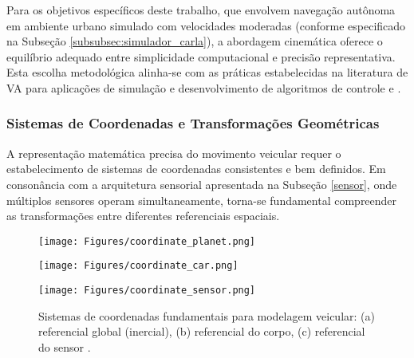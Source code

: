 Para os objetivos específicos deste trabalho, que envolvem navegação autônoma em ambiente urbano simulado com velocidades moderadas (conforme especificado na Subseção \ref{subsubsec:simulador_carla}), a abordagem cinemática oferece o equilíbrio adequado entre simplicidade computacional e precisão representativa. Esta escolha metodológica alinha-se com as práticas estabelecidas na literatura de VA para aplicações de simulação e desenvolvimento de algoritmos de controle \cite{University_of_Toronto2018-fe} e \cite{lavalle2006planning}.

\subsubsection{Sistemas de Coordenadas e Transformações Geométricas} \label{trans}

A representação matemática precisa do movimento veicular requer o estabelecimento de sistemas de coordenadas consistentes e bem definidos. Em consonância com a arquitetura sensorial apresentada na Subseção \ref{sensor}, onde múltiplos sensores operam simultaneamente, torna-se fundamental compreender as transformações entre diferentes referenciais espaciais.

\begin{figure}[htb]
 \centering
  \begin{minipage}{0.3\textwidth}
    \centering
    \texttt{[image: Figures/coordinate\_planet.png]}
  \end{minipage}
  \hfill
  \begin{minipage}{0.3\textwidth}
    \centering
    \texttt{[image: Figures/coordinate\_car.png]}
  \end{minipage}
  \hfill
  \begin{minipage}{0.3\textwidth}
    \centering
    \texttt{[image: Figures/coordinate\_sensor.png]}
  \end{minipage}
  \caption{Sistemas de coordenadas fundamentais para modelagem veicular: (a) referencial global (inercial), (b) referencial do corpo, (c) referencial do sensor \cite[p.~33]{jacobson2016vehicle}.}
\label{coordenadas}
\end{figure}

